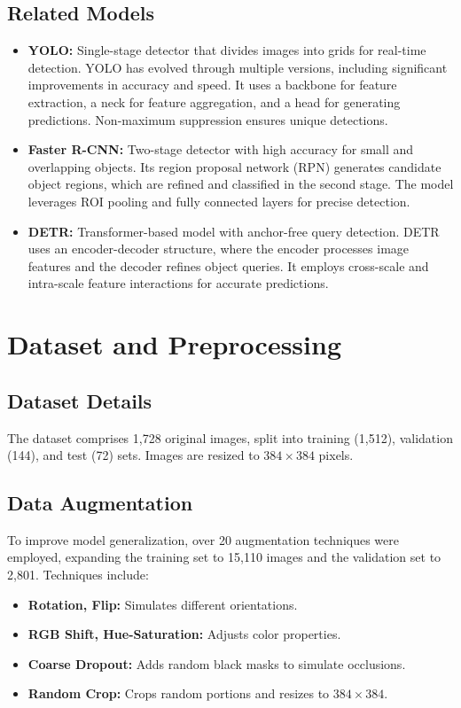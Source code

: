 \documentclass[a4paper]{article}
\begin{document}
\subsection{Related Models}
\begin{itemize}
    \item \textbf{YOLO:} Single-stage detector that divides images into grids for real-time detection. YOLO has evolved through multiple versions, including significant improvements in accuracy and speed. It uses a backbone for feature extraction, a neck for feature aggregation, and a head for generating predictions. Non-maximum suppression ensures unique detections. \cite{1}
    \item \textbf{Faster R-CNN:} Two-stage detector with high accuracy for small and overlapping objects. Its region proposal network (RPN) generates candidate object regions, which are refined and classified in the second stage. The model leverages ROI pooling and fully connected layers for precise detection. \cite{3}
    \item \textbf{DETR:} Transformer-based model with anchor-free query detection. DETR uses an encoder-decoder structure, where the encoder processes image features and the decoder refines object queries. It employs cross-scale and intra-scale feature interactions for accurate predictions. \cite{4}
\end{itemize}

\newpage
\section{Dataset and Preprocessing}
\subsection{Dataset Details}
The dataset \cite{5} comprises 1,728 original images, split into training (1,512), validation (144), and test (72) sets. Images are resized to $384\times384$ pixels.

\subsection{Data Augmentation}
To improve model generalization, over 20 augmentation techniques were employed, expanding the training set to 15,110 images and the validation set to 2,801. Techniques include:
\begin{itemize}
    \item \textbf{Rotation, Flip:} Simulates different orientations.
    \item \textbf{RGB Shift, Hue-Saturation:} Adjusts color properties.
    \item \textbf{Coarse Dropout:} Adds random black masks to simulate occlusions.
    \item \textbf{Random Crop:} Crops random portions and resizes to $384\times384$.
\end{itemize}
\end{document}

